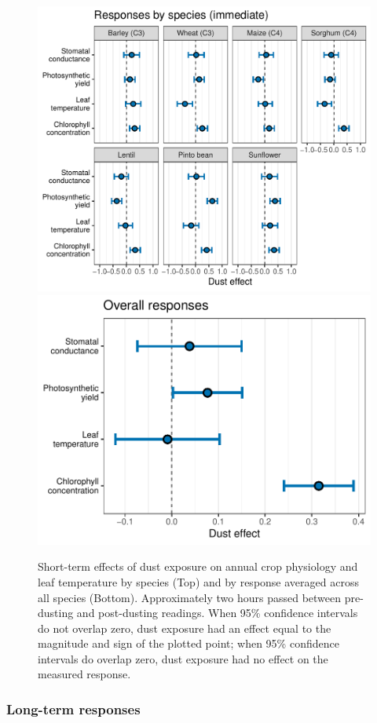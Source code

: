 \documentclass{svjour3}
\begin{document}
\begin{figure}
	 \hspace{0.5em}\includegraphics[width=0.8\linewidth]{st_spp_gg-1}
	\includegraphics[width=0.75\linewidth]{st_ov_gg-1}
	\caption{Short-term effects of dust exposure on annual crop physiology and leaf temperature by species (Top) and by response averaged across all species (Bottom).
		Approximately two hours passed between pre-dusting and post-dusting readings. 
		When 95\% confidence intervals do not overlap zero, dust exposure had an effect equal to the magnitude and sign of the plotted point; when 95\% confidence intervals do overlap zero, dust exposure had no effect on the measured response. \label{fig:st_cropCIs} }
\end{figure}

\subsubsection{Long-term responses}
\end{document}
